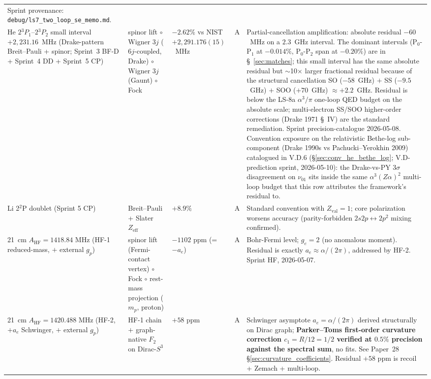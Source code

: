 \documentclass[11pt]{article}
\begin{document}
\begin{table}[h]
\begin{tabular}{p{3.8cm} p{2.5cm} p{1.5cm} p{1.4cm} p{4.5cm}}
Sprint provenance: \texttt{debug/ls7\_two\_loop\_se\_memo.md}. \\
He $2{}^3P_1$--$2{}^3P_2$ small interval $+2{,}231.16$~MHz (Drake-pattern
Breit--Pauli + spinor; Sprint~3 BF-D + Sprint~4 DD + Sprint~5 CP) &
spinor lift $\circ$ Wigner $3j$ ($6j$-coupled, Drake) $\circ$ Wigner $3j$
(Gaunt) $\circ$ Fock &
$-2.62\%$ vs NIST $+2{,}291.176(15)$~MHz & A & Partial-cancellation
amplification: absolute residual $-60$~MHz on a $2.3$~GHz interval.
The dominant intervals (P$_0$-P$_1$ at $-0.014\%$, P$_0$-P$_2$ span at
$-0.20\%$) are in \S~\ref{sec:matches}; this small interval has the
same absolute residual but $\sim$10$\times$ larger fractional residual
because of the structural cancellation SO ($-58$~GHz) $+$ SS ($-9.5$~GHz)
$+$ SOO ($+70$~GHz) $\approx +2.2$~GHz.  Residual is below the LS-8a
$\alpha^3/\pi$ one-loop QED budget on the absolute scale; multi-electron
SS/SOO higher-order corrections (Drake 1971 \S~IV) are the standard
remediation.  Sprint precision-catalogue 2026-05-08.  Convention exposure
on the relativistic Bethe-log sub-component (Drake 1990s vs Pachucki--Yerokhin
2009) catalogued in V.D.6 (\S\ref{sec:conv_he_bethe_log}; V.D-prediction
sprint, 2026-05-10): the Drake-vs-PY 3$\sigma$ disagreement on $\nu_{01}$
sits inside the same $\alpha^3(Z\alpha)^2$ multi-loop budget that this
row attributes the framework's residual to. \\
Li 2$^2$P doublet (Sprint 5 CP) & Breit--Pauli + Slater $Z_{\text{eff}}$
& $+8.9\%$ & A & Standard convention with $Z_\text{val}=1$;
core polarization worsens accuracy (parity-forbidden
$2s2p \leftrightarrow 2p^2$ mixing confirmed). \\
21~cm $A_\text{HF} = 1418.84$ MHz (HF-1 reduced-mass, $+$ external $g_p$)
& spinor lift (Fermi-contact vertex) $\circ$ Fock $\circ$ rest-mass
projection ($m_p$, proton) & $-1102$ ppm (= $-a_e$) & A & Bohr-Fermi level;
$g_e = 2$ (no anomalous moment).  Residual is exactly $a_e \approx
\alpha/(2\pi)$, addressed by HF-2.  Sprint HF, 2026-05-07. \\
21~cm $A_\text{HF} = 1420.488$ MHz (HF-2, $+a_e$ Schwinger, $+$ external
$g_p$) & HF-1 chain $+$ graph-native $F_2$ on Dirac-$S^3$ & $+58$ ppm & A
& Schwinger
asymptote $a_e = \alpha/(2\pi)$ derived structurally on Dirac graph;
\textbf{Parker--Toms first-order curvature correction $c_1 = R/12 = 1/2$
verified at $0.5\%$ precision against the spectral sum}, no fits.  See
Paper~28 \S\ref{sec:curvature_coefficients}.  Residual $+58$ ppm is
recoil + Zemach + multi-loop. \\

\end{tabular}
\end{table}
\end{document}
